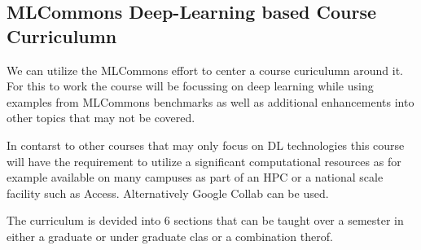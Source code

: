 \documentclass[utf8]{FrontiersinVancouver} %
\begin{document}
\subsection{MLCommons Deep-Learning based Course Curriculumn}

We can utilize the MLCommons effort to center a course curiculumn
around it. For this to work the course will be focussing on deep
learning while using examples from MLCommons benchmarks as well as
additional enhancements into other topics that may not be covered.

In contarst to other courses that may only focus on DL technologies
this course will have the requirement to utilize a significant
computational resources as for example available on many campuses as
part of an HPC or a national scale facility such as
Access. Alternatively Google Collab can be used.

The curriculum is devided into 6 sections that can be taught over a
semester in either a graduate or under graduate clas or a combination
therof.
\end{document}
